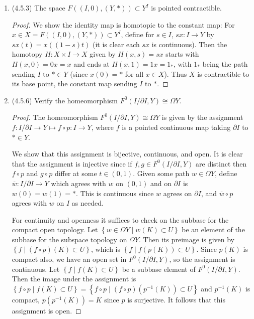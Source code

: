 \documentclass[11pt]{article}
\newcommand{\cbr}[1]{\left\{#1\right\}}
\begin{document}
\begin{enumerate}
\begin{proof}
      For (b) Since products of intervals are compact (locally compact), we can use Theorem 2.4.6 (Exponential law) to see that the adjunction map $\alpha\colon Y^{I^k\times I^l}\xrightarrow{\cong} (Y^{I^l})^{I^k}$ is a homeomorphism. Restricting to the subspaces which fix the image of the boundaries of these cubes to the basepoint of $Y$, we should also obtain a homeomorphism of subspaces $\Omega^k\Omega^l(Y)\cong\Omega^{k+l}(Y)$. In particular, the subspace $\Omega^{k+l}(Y)$ would be sent to the subspace of $(Y^{I^l})^{I^k}$ whose elements are maps which all send the boundaries of cubes to the basepoint of $Y$, which is $\Omega^k\Omega^l(Y)$.
    \end{proof}
    \item (4.5.3) The space $F((I,0),(Y,\ast))\subset Y^I$ is pointed contractible.\begin{proof}
      We show the identity map is homotopic to the constant map: For $x\in X = F((I,0),(Y,\ast))\subset Y^I$, define for $s\in I$, $sx\colon I\to Y$ by $sx(t) = x((1-s)t)$ (it is clear each $sx$ is continuous). Then the homotopy $H\colon X\times I \to X$ given by $H(x,s) = sx$ starts with $H(x,0) = 0x = x$ and ends at $H(x,1) = 1x = 1_\ast$, with $1_\ast$ being the path sending $I$ to $\ast\in Y$ (since $x(0) = \ast$ for all $x\in X$). Thus $X$ is contractible to its base point, the constant map sending $I$ to $\ast$.
    \end{proof}
    \item (4.5.6) Verify the homeomorphism $F^0(I/\partial I,Y)\cong \Omega Y$.\begin{proof}
      The homeomorphism $F^0(I/\partial I,Y)\cong \Omega Y$ is given by the assignment $f\colon I/\partial I\to Y \mapsto f\circ p\colon I\to Y$, where $f$ is a pointed continuous map taking $\partial I$ to $\ast\in Y$.

      We show that this assignment is bijective, continuous, and open. It is clear that the assignment is injective since if $f,g\in F^0(I/\partial I,Y)$ are distinct then $f\circ p$ and $g\circ p$ differ at some $t\in (0,1)$. Given some path $w\in \Omega Y$, define $\overline{w}\colon I/\partial I\to Y$ which agrees with $w$ on $(0,1)$ and on $\partial I$ is $w(0)=w(1) = \ast$. This is continuous since $w$ agrees on $\partial I$, and $\overline{w}\circ p$ agrees with $w$ on $I$ as needed.

      For continuity and openness it suffices to check on the subbase for the compact open topology. Let $\cbr{w\in \Omega Y\mid w(K)\subset U}$ be an element of the subbase for the subspace topology on $\Omega Y$. Then its preimage is given by $\cbr{f\mid (f\circ p)(K)\subset U}$, which is $\cbr{f\mid f(p(K))\subset U}$. Since $p(K)$ is compact also, we have an open set in $F^0(I/\partial I,Y)$, so the assignment is continuous. Let $\cbr{f\mid f(K)\subset U}$ be a subbase element of $F^0(I/\partial I,Y)$. Then the image under the assignment is $\cbr{f\circ p\mid f(K)\subset U} = \cbr{f\circ p\mid (f\circ p)(p^{-1}(K))\subset U}$ and $p^{-1}(K)$ is compact, $p(p^{-1}(K)) = K$ since $p$ is surjective. It follows that this assignment is open.


\end{proof}
\end{enumerate}
\end{document}
